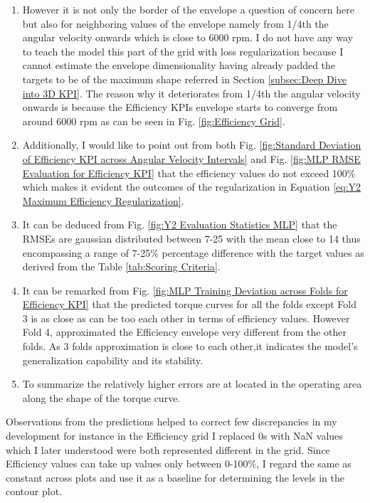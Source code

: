 \documentclass{report} %
\begin{document}
\begin{enumerate}[nosep]
    \item However it is not only the border of the envelope a question of concern here but also for neighboring values of the envelope namely from 1/4th the 
    angular velocity onwards which is close to 6000 rpm. 
    I do not have any way to teach the model this part of the grid with loss regularization because I cannot estimate the envelope dimensionality having already padded 
    the targets to be of the maximum shape referred in Section \ref{subsec:Deep Dive into 3D KPI}. The reason why it deteriorates from 1/4th the angular velocity onwards is 
    because the Efficiency \ac{KPI}s envelope starts to converge from around 6000 rpm as can be seen in Fig. \ref{fig:Efficiency Grid}. 
    \item Additionally, I would like to point out from both Fig. \ref{fig:Standard Deviation of Efficiency KPI across Angular Velocity Intervals} and Fig. 
    \ref{fig:MLP RMSE Evaluation for Efficiency KPI} that the efficiency values do not exceed 100\% which makes it evident the outcomes of the regularization in Equation 
    \ref{eq:Y2 Maximum Efficiency Regularization}.
    \item It can be deduced from Fig. \ref{fig:Y2 Evaluation Statistics MLP} that the \ac{RMSE}s are gaussian distributed between 7-25 with the mean close to 14 thus 
    encompassing a range of 7-25\% percentage difference with the target values as derived from the Table \ref{tab:Scoring Criteria}.
    \item It can be remarked from Fig. \ref{fig:MLP Training Deviation across Folds for Efficiency KPI} that the predicted torque curves for all the folds except Fold 3 
    is as close as can be too each other in terms of efficiency values. However Fold 4, approximated the Efficiency envelope very different from the other folds. 
    As 3 folds approximation is close to each other,it indicates the model's generalization capability and its stability.
    \item To summarize the relatively higher errors are at located in the operating area along the shape of the torque curve.\\
\end{enumerate}

Observations from the predictions helped to correct few discrepancies in my development for instance in the Efficiency grid I replaced 0s with \ac{NaN} values which 
I later understood were both represented different in the grid. Since Efficiency values can take up values only between 0-100\%, I regard the same as constant 
across plots and use it as a baseline for determining the levels in the contour plot.
\end{document}

